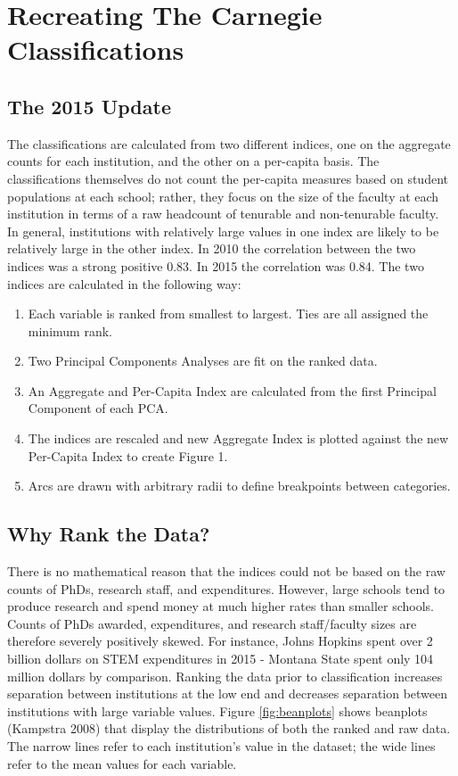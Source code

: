 \documentclass{article}
\begin{document}
\section{Recreating The Carnegie Classifications}
\subsection{The 2015 Update}
The classifications are calculated from two different indices, one on the aggregate counts for each institution, and the other on a per-capita basis. The classifications themselves do not count the per-capita measures based on student populations at each school; rather, they focus on the size of the faculty at each institution in terms of a raw headcount of tenurable and non-tenurable faculty.\\
In general, institutions with relatively large values in one index are likely to be relatively large in the other index. In 2010 the correlation between the two indices was a strong positive 0.83. In 2015 the correlation was 0.84.  The two indices are calculated in the following way: 
\begin{enumerate}
\item Each variable is ranked from smallest to largest. Ties are all assigned the minimum rank.
\item Two Principal Components Analyses are fit on the ranked data.
\item An Aggregate and Per-Capita Index are calculated from the first Principal Component of each PCA.
\item The indices are rescaled and new Aggregate Index is plotted against the new Per-Capita Index to create Figure 1.
\item Arcs are drawn with arbitrary radii to define breakpoints between categories.
\end{enumerate}

\subsection{Why Rank the Data?}
There is no mathematical reason that the indices could not be based on the raw counts of PhDs, research staff, and expenditures. However, large schools tend to produce research and spend money at much higher rates than smaller schools.  Counts of PhDs awarded, expenditures, and research staff/faculty sizes are therefore severely positively skewed. For instance, Johns Hopkins spent over 2 billion dollars on STEM expenditures in 2015 - Montana State spent only 104 million dollars by comparison.   Ranking the data prior to classification increases separation between institutions at the low end and decreases separation between institutions with large variable values. Figure \ref{fig:beanplots} shows beanplots (Kampstra 2008) that display the distributions of both the ranked and raw data. The narrow lines refer to each institution's value in the dataset; the wide lines refer to the mean values for each variable.  \\
\end{document}
